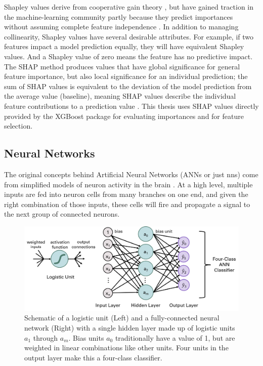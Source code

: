 Shapley values derive from cooperative gain theory \citep{shapley_value_1997}, but have gained traction in the machine-learning community partly because they predict importances without assuming complete feature independence \citep{lundberg_unified_2017}. In addition to managing collinearity, Shapley values have several desirable attributes. For example, if two features impact a model prediction equally, they will have equivalent Shapley values. And a Shapley value of zero means the feature has no predictive impact. The SHAP method produces values that have global significance for general feature importance, but also local significance for an individual prediction; the sum of SHAP values is equivalent to the deviation of the model prediction from the average value (baseline), meaning SHAP values describe the individual feature contributions to a prediction value \citep{lundberg_unified_2017}. This thesis uses SHAP values directly provided by the XGBoost package \citep{xgboost_developers_xgboost_2020} for evaluating importances and for feature selection.

\subsection{Neural Networks}\label{ch3:ann}

The original concepts behind Artificial Neural Networks (ANNs or just \acrshort{nn}s) come from simplified models of neuron activity in the brain \citep[p.\ 394]{hastie_elements_2009}. At a high level, multiple inputs are fed into neuron cells from many branches on one end, and given the right combination of those inputs, these cells will fire and propagate a signal to the next group of connected neurons.
\begin{figure}[H]
\centering
\includegraphics[width=\textwidth]{templates/images/Figure-ANN_schematic.png}
\caption[Neural network schematic]{Schematic of a logistic unit (Left) and a fully-connected neural network (Right) with a single hidden layer made up of logistic units $a_1$ through $a_m$. Bias units $a_0$ traditionally have a value of 1, but are weighted in linear combinations like other units. Four units in the output layer make this a four-class classifier.}
\label{fig:nn_schematic}
\end{figure}

